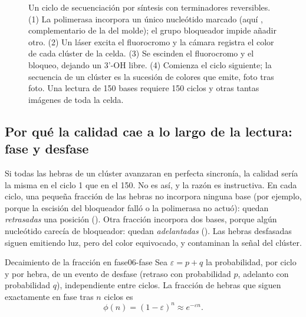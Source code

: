 \begin{figure}[t]
\caption[Un ciclo de secuenciación por síntesis]{Un ciclo de secuenciación por síntesis con terminadores reversibles. (1) La polimerasa incorpora un único nucleótido marcado (aquí , complementario de la  del molde); el grupo bloqueador impide añadir otro. (2) Un láser excita el fluorocromo y la cámara registra el color de cada clúster de la celda. (3) Se escinden el fluorocromo y el bloqueo, dejando un 3'-OH libre. (4) Comienza el ciclo siguiente; la secuencia de un clúster es la sucesión de colores que emite, foto tras foto. Una lectura de 150 bases requiere 150 ciclos y otras tantas imágenes de toda la celda.}
\label{fig:06-sbs}
\end{figure}

\subsection{Por qué la calidad cae a lo largo de la lectura: fase y desfase}

Si todas las hebras de un clúster avanzaran en perfecta sincronía, la calidad sería la misma en el ciclo 1 que en el 150. No es así, y la razón es instructiva. En cada ciclo, una pequeña fracción de las hebras no incorpora ninguna base (por ejemplo, porque la escisión del bloqueador falló o la polimerasa no actuó): quedan \emph{retrasadas} una posición (). Otra fracción incorpora dos bases, porque algún nucleótido carecía de bloqueador: quedan \emph{adelantadas} (). Las hebras desfasadas siguen emitiendo luz, pero del color equivocado, y contaminan la señal del clúster.

\begin{teorema}{Decaimiento de la fracción en fase}{06-fase}
Sea $\varepsilon = p + q$ la probabilidad, por ciclo y por hebra, de un evento de desfase (retraso con probabilidad $p$, adelanto con probabilidad $q$), independiente entre ciclos. La fracción de hebras que siguen exactamente en fase tras $n$ ciclos es
\begin{equation}\label{eq:06-fase}
\phi(n) = (1-\varepsilon)^{n} \approx e^{-\varepsilon n}.
\end{equation}
\end{teorema}

